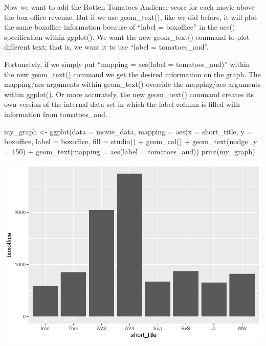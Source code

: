 \documentclass[
]{krantz}
\makeatletter
\newenvironment{Shaded}{\begin{snugshade}}{\end{snugshade}}
\newcommand{\AttributeTok}[1]{\textcolor[rgb]{0.61,0.61,0.61}{#1}}
\newcommand{\DecValTok}[1]{\textcolor[rgb]{0.06,0.06,0.06}{#1}}
\newcommand{\FunctionTok}[1]{\textcolor[rgb]{0,0,0}{#1}}
\newcommand{\NormalTok}[1]{#1}
\newcommand{\OtherTok}[1]{\textcolor[rgb]{0.37,0.37,0.37}{#1}}
\newcommand{\SpecialCharTok}[1]{\textcolor[rgb]{0,0,0}{#1}}
\newenvironment{kframe}{%
\medskip{}
\setlength{\fboxsep}{.8em}
 \def\at@end@of@kframe{}%
 \ifinner\ifhmode%
  \def\at@end@of@kframe{\end{minipage}}%
  \begin{minipage}{\columnwidth}%
 \fi\fi%
 \def\FrameCommand##1{\hskip\@totalleftmargin \hskip-\fboxsep
 \colorbox{shadecolor}{##1}\hskip-\fboxsep
     \hskip-\linewidth \hskip-\@totalleftmargin \hskip\columnwidth}%
 \MakeFramed {\advance\hsize-\width
   \@totalleftmargin\z@ \linewidth\hsize
   \@setminipage}}%
 {\par\unskip\endMakeFramed%
 \at@end@of@kframe}
\renewenvironment{Shaded}{\begin{kframe}}{\end{kframe}}
\makeatother
\begin{document}
Now we want to add the Rotten Tomatoes Audience score for each movie above the box office revenue. But if we use geom\_text(), like we did before, it will plot the same boxoffice information because of ``label = boxoffice'' in the aes() specification within ggplot(). We want the new geom\_text() command to plot different text; that is, we want it to use ``label = tomatoes\_aud''.

Fortunately, if we simply put ``mapping = aes(label = tomatoes\_aud)'' within the new geom\_text() command we get the desired information on the graph. The mapping/aes arguments within geom\_text() override the mapping/aes arguments within ggplot(). Or more accurately, the new geom\_text() command creates its own version of the internal data set in which the label column is filled with information from tomatoes\_aud.

\begin{Shaded}
\begin{Highlighting}[]
\NormalTok{my\_graph }\OtherTok{\textless{}{-}} \FunctionTok{ggplot}\NormalTok{(}\AttributeTok{data =}\NormalTok{ movie\_data,}
           \AttributeTok{mapping =} \FunctionTok{aes}\NormalTok{(}\AttributeTok{x =}\NormalTok{ short\_title,}
                         \AttributeTok{y =}\NormalTok{ boxoffice,}
                         \AttributeTok{label =}\NormalTok{ boxoffice, }
                         \AttributeTok{fill =}\NormalTok{ studio)) }\SpecialCharTok{+}
  \FunctionTok{geom\_col}\NormalTok{() }\SpecialCharTok{+}
  \FunctionTok{geom\_text}\NormalTok{(}\AttributeTok{nudge\_y =} \DecValTok{150}\NormalTok{)  }\SpecialCharTok{+}
  \FunctionTok{geom\_text}\NormalTok{(}\AttributeTok{mapping =} \FunctionTok{aes}\NormalTok{(}\AttributeTok{label =}\NormalTok{ tomatoes\_aud)) }
\FunctionTok{print}\NormalTok{(my\_graph)}
\end{Highlighting}
\end{Shaded}

\includegraphics[width=0.65\linewidth]{bookdown_files/figure-latex/unnamed-chunk-114-1}
\end{document}
